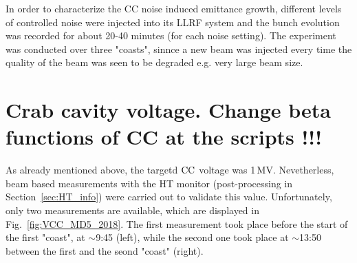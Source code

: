 In order to characterize the CC noise induced emittance growth, different levels of controlled noise were injected into its LLRF system and the bunch evolution was recorded for about 20-40 minutes (for each noise setting). The experiment was conducted over three "coasts", sinnce a new beam was injected every time the quality of the beam was seen to be degraded e.g. very large beam size.


\section{Crab cavity voltage. Change beta functions of CC at the scripts !!!}\label{sec:CC_voltage_meas2018}

As already mentioned above, the targetd ${\mathrm{CC}}$ voltage was 1\,MV. Nevetherless, beam based measurements with the HT monitor (post-processing in Section~\ref{sec:HT_info}) were carried out to validate this value. Unfortunately, only two measurements are available, which are displayed in Fig.~\ref{fig:VCC_MD5_2018}. The first measurement took place before the start of the first "coast", at $\sim$9:45 (left), while the second one took place at $\sim$13:50 between the first and the seond "coast" (right). 



